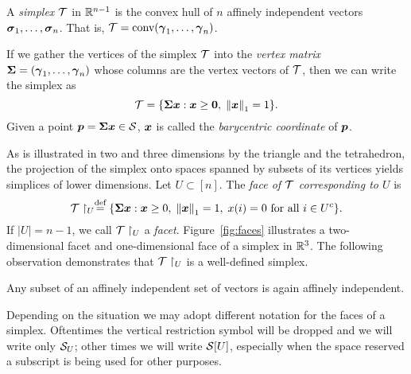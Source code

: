 \begin{definition}
\label{def:simplex}
A \emph{simplex} $\mathcal{T}$ in $\mathbb{R}^{n-1}$ is the convex hull of $n$ affinely independent vectors $\vb*{\sigma}_1,\dots,\vb*{\sigma}_n$. That is, $\mathcal{T}=\textnormal{conv}(\vb*{\gamma}_1,\dots,\vb*{\gamma}_n)$.  
\end{definition}

If we gather the vertices of the simplex $\mathcal{T}$ into the \emph{vertex matrix} $\boldsymbol{\Sigma}=(\vb*{\gamma}_1,\dots,\vb*{\gamma}_n)$ whose columns are the vertex vectors of $\mathcal{T}$, then we can write the simplex as 
\begin{equation*}
    \mathcal{T} = \{\boldsymbol{\Sigma} \vb*{x}:\vb*{x}\geq \vb{0}, \; \norm{\vb*{x}}_1=1\}.
\end{equation*}
Given a point $\vb*{p}=\boldsymbol{\Sigma}\vb*{x}\in\mathcal{S}$, $\vb*{x}$ is called the \emph{barycentric coordinate} of $\vb*{p}$.  

As is illustrated in two and three dimensions by the triangle and the tetrahedron, the projection of the simplex onto spaces spanned by subsets of its vertices yields simplices of lower dimensions. Let $U\subset [n]$. The \emph{face of $\mathcal{T}$ corresponding to $U$} is 
\begin{equation}
\label{eq:T_U}
    \mathcal{T}\restriction_U \overset{\text{def}}{=} \{\boldsymbol{\Sigma}\vb*{x}: \vb*{x}\geq 0,\;\norm{\vb*{x}}_1=1,\;x(i)=0\text{ for all }i\in U^c\}.
\end{equation}
If $|U|=n-1$, we call $\mathcal{T}\restriction_U$ a \emph{facet}. Figure~\ref{fig:faces} illustrates a two-dimensional   facet and one-dimensional  face of a simplex in $\mathbb{R}^3$. The following observation demonstrates that $\mathcal{T}\restriction_U$ is a well-defined simplex. 
\begin{observation}
	\label{obs:subset_affinely_independent}
	Any subset of an affinely independent set of vectors is again affinely independent. 
\end{observation}

Depending on the situation we may adopt different notation for the faces of a simplex. Oftentimes the vertical restriction symbol will be dropped and we will write only $\mathcal{S}_U$; other times we will write $\mathcal{S}[U]$, especially when the space reserved a subscript is being used for other purposes. 

